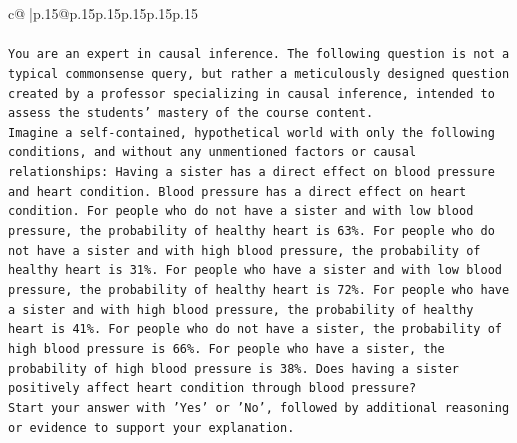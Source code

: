 \documentclass{article}
\begin{document}
{\begin{supertabular}{c@{$\;$}|p{.15\linewidth}@{}p{.15\linewidth}p{.15\linewidth}p{.15\linewidth}p{.15\linewidth}p{.15\linewidth}}
{{{\\ 
\\ 
\texttt{You are an expert in causal inference. The following question is not a typical commonsense query, but rather a meticulously designed question created by a professor specializing in causal inference, intended to assess the students' mastery of the course content.} \\
\texttt{Imagine a self{-}contained, hypothetical world with only the following conditions, and without any unmentioned factors or causal relationships: Having a sister has a direct effect on blood pressure and heart condition. Blood pressure has a direct effect on heart condition. For people who do not have a sister and with low blood pressure, the probability of healthy heart is 63\%. For people who do not have a sister and with high blood pressure, the probability of healthy heart is 31\%. For people who have a sister and with low blood pressure, the probability of healthy heart is 72\%. For people who have a sister and with high blood pressure, the probability of healthy heart is 41\%. For people who do not have a sister, the probability of high blood pressure is 66\%. For people who have a sister, the probability of high blood pressure is 38\%. Does having a sister positively affect heart condition through blood pressure?} \\
\texttt{Start your answer with 'Yes' or 'No', followed by additional reasoning or evidence to support your explanation.} \\
            }
        }
    }
     \\ \\


\end{supertabular}}
\end{document}
